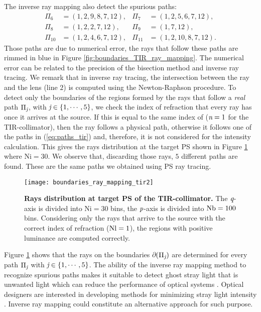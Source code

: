 The inverse ray mapping also detect the spurious paths:
\begin{equation}\label{eq:paths_tir}
\begin{array}{llll}
\Pi_6&=(1,2,9,8,7,12), & \Pi_7&=(1,2,5,6,7,12), \\
\Pi_8&=(1,2,2,7,12),& \Pi_9&=(1,7,12),\\
\Pi_{10}&=(1,2,4,6,7,12),& \Pi_{11}&=(1,2,10,8,7,12).
\end{array}\end{equation}
Those paths are due to numerical error, the rays that follow these paths are rimmed in blue in Figure \ref{fig:boundaries_TIR_ray_mapping}. The numerical error can be related to the precision of the bisection method and inverse ray tracing. We remark that in inverse ray tracing, the intersection between the ray and the lens (line $2$) is computed using the Newton-Raphson procedure.
To detect only the boundaries of the regions formed by the rays that follow a \textit{real} path $\Pi_{\textit{j}}$, with $\textit{j}\in\{1, \cdots, 5\}$, we check the index of refraction that every ray has once it arrives at the source.
If this is equal to the same index of  ($\textit{n}=1$ for the TIR-collimator), then the ray follows a physical path, otherwise it follows one of the paths in (\ref{eq:paths_tir}) and, therefore, it is not considered for the intensity calculation. This gives the rays distribution at the target PS shown in Figure \ref{fig:boundaries_TIR_ray_mapping1} where $\textrm{Ni}=30$. We observe that, discarding those rays, $5$ different paths are found. These are the same paths we obtained using PS ray tracing.
\begin{figure}[h]
  \begin{center}
  \texttt{[image: boundaries\_ray\_mapping\_tir2]}
  \end{center}
  \caption{\textbf{Rays distribution at target PS of the TIR-collimator.}
 The $\textit{q}$-axis is divided into $\textrm{Ni}=30$ bins, the $\textit{p}$-axis is divided into $\textrm{Nb} = 100$ bins. Considering only the rays that arrive to the source with the correct index of refraction ($\textrm{Nl}=1$), the regions with positive luminance are computed correctly.}
\label{fig:boundaries_TIR_ray_mapping1}
 \end{figure}
Figure \ref{fig:boundaries_TIR_ray_mapping1} shows that the rays on the boundaries $\partial$$(\Pi_{\textit{j}})$ are determined for every path $\Pi_{\textit{j}}$ with $\textit{j}\in\{1, \cdots, 5\}$. The ability of the inverse ray mapping method to recognize spurious paths makes it suitable to detect ghost stray light that is unwanted light which can reduce the performance of optical systems \cite{breault1995control}. Optical designers are interested in developing methods for minimizing stray light intensity \cite{grabarnik2015optical}. Inverse ray mapping could constitute an alternative approach for such purpose. 
